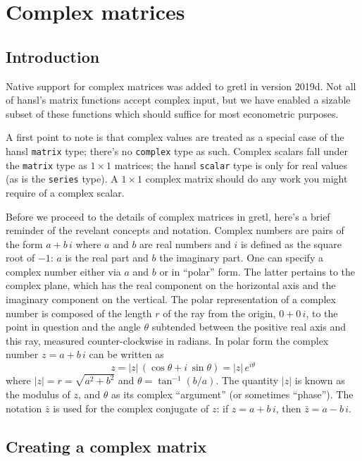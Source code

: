 \chapter{Complex matrices}
\label{chap:complex}

\section{Introduction}
\label{sec:cmplx-intro}

Native support for complex matrices was added to gretl in version
2019d. Not all of hansl's matrix functions accept complex input, but
we have enabled a sizable subset of these functions which should
suffice for most econometric purposes.

A first point to note is that complex values are treated as a special
case of the hansl \texttt{matrix} type; there's no \texttt{complex}
type as such. Complex scalars fall under the \texttt{matrix} type as
$1 \times 1$ matrices; the hansl \texttt{scalar} type is only for real
values (as is the \texttt{series} type). A $1 \times 1$ complex matrix
should do any work you might require of a complex scalar.

Before we proceed to the details of complex matrices in gretl, here's
a brief reminder of the revelant concepts and notation. Complex
numbers are pairs of the form $a + b\,i$ where $a$ and $b$ are real
numbers and $i$ is defined as the square root of $-1$: $a$ is the real
part and $b$ the imaginary part. One can specify a complex number
either via $a$ and $b$ or in ``polar'' form. The latter pertains to
the complex plane, which has the real component on the horizontal axis
and the imaginary component on the vertical. The polar representation
of a complex number is composed of the length $r$ of the ray from the
origin, $0 + 0\,i$, to the point in question and the angle $\theta$
subtended between the positive real axis and this ray, measured
counter-clockwise in radians. In polar form the complex number
$z = a + b\,i$ can be written as
\[
  z = |z|\,(\cos \theta + i\,\sin \theta) = |z|\,e^{i\theta}
\]
where $|z| = r = \sqrt{a^2 + b^2}$ and $\theta = \tan^{-1}(b/a)$. The
quantity $|z|$ is known as the modulus of $z$, and $\theta$ as its
complex ``argument'' (or sometimes ``phase''). The notation $\bar{z}$
is used for the complex conjugate of $z$: if $z = a + b\,i$, then
$\bar{z} = a - b\,i$.

\section{Creating a complex matrix}
\label{sec:cmplx-create}

